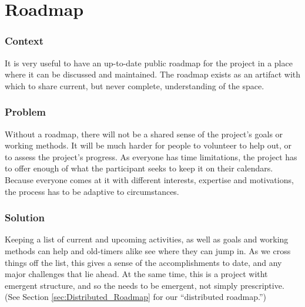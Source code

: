 \section{Roadmap} \label{sec:Roadmap}

\subsubsection*{Context} It is very useful to have an up-to-date public roadmap for the project in a place where it can be discussed and maintained. The roadmap exists as an artifact with which to share current, but never complete, understanding of the space.

\subsubsection*{Problem} Without a roadmap, there will not be a shared sense of the project's goals or working methods. It will be much harder for people to volunteer to help out, or to assess the project's progress.  As everyone has time limitations, the project has to offer enough of what the participant seeks to keep it on their calendars.  Because everyone comes at it with different interests, expertise  and motivations, the process has to be adaptive to circumstances.

\subsubsection*{Solution} Keeping a list of current and upcoming activities, as well as goals and working methods can help  and old-timers alike see where they can jump in. As we cross things off the list, this gives a sense of the accomplishments to date, and any major challenges that lie ahead.  At the same time, this is a project witht emergent structure, and so the  needs to be emergent, not simply prescriptive.  (See Section \ref{sec:Distributed_Roadmap} for our ``distributed roadmap.'')


